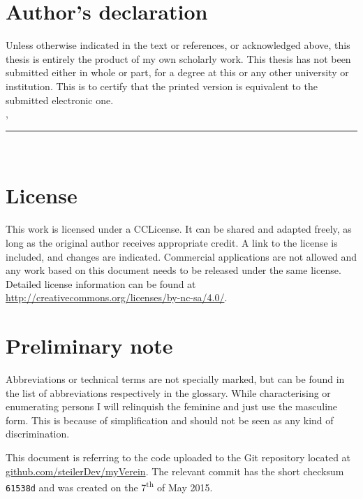 \thispagestyle{empty}

\section*{Author's declaration}
\vspace*{1em}
Unless otherwise indicated in the text or references, or acknowledged above, this thesis is entirely the product of my own scholarly work. This thesis has not been submitted either in whole or part, for a degree at this or any other university or institution. This is to certify that the printed version is equivalent to the submitted electronic one.
\vspace{2em}\\
\abgabeort, \datumAbgabe
\vspace{3em}\\
\rule{6cm}{0.4pt}\\
\autor
\vspace*{1.5em}

\section*{License}

\vspace*{1.5em}
This work is licensed under a \acrfull{CCLicense}. It can be shared and adapted freely, as long as the original author receives appropriate credit. A link to the license is included, and changes are indicated. Commercial applications are not allowed and any work based on this document needs to be released under the same license. Detailed license information can be found at \url{http://creativecommons.org/licenses/by-nc-sa/4.0/}.
\vspace{1.5em}

\section*{Preliminary note}

\vspace*{1.5em}
Abbreviations or technical terms are not specially marked, but can be found in the list of abbreviations respectively in the glossary. While characterising or enumerating persons I will relinquish the feminine and just use the masculine form. This is because of simplification and should not be seen as any kind of discrimination. 

This document is referring to the code uploaded to the Git repository located at \url{github.com/steilerDev/myVerein}. The relevant commit has the short checksum \texttt{61538d} and was created on the 7\textsuperscript{th} of May 2015.
